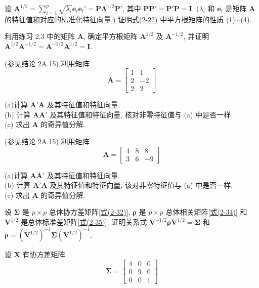 \medskip
{}\quad 设 $\mathbf{A}^{1/2}=\sum_{i=1}^{p}\sqrt{\lambda_{i}}\mathbf{e}_{i}\mathbf{e}_{i}'=\mathbf{P}\boldsymbol{\Lambda}^{1/2}\mathbf{P}'$, 其中 $\mathbf{P}\mathbf{P}'=\mathbf{P}'\mathbf{P}=\mathbf{I}$. ($\lambda_{i}$ 和 $\mathbf{e}_{i}$ 是矩阵 $\mathbf{A}$ 的特征值和对应的标准化特征向量.) 证明\hyperref[eq:2-22]{式(2-22)} 中平方根矩阵的性质 (1)$\sim$(4).

\medskip
{}\quad 利用练习 2.3 中的矩阵 $\mathbf{A}$, 确定平方根矩阵 $\mathbf{A}^{1/2}$ 及 $\mathbf{A}^{-1/2}$, 并证明 $\mathbf{A}^{1/2}\mathbf{A}^{-1/2}=\mathbf{A}^{-1/2}\mathbf{A}^{1/2}=\mathbf{I}$.

\medskip
{}\quad (参见结论 2A.15) 利用矩阵
\[
\mathbf{A}=\begin{bmatrix}1&1\\2&-2\\2&2\end{bmatrix}
\]
\begin{tabbing}
\hspace*{2em}\=(a)\quad \= 计算 $\mathbf{A}'\mathbf{A}$ 及其特征值和特征向量.\\[2pt]
\>(b)\> 计算 $\mathbf{A}\mathbf{A}'$ 及其特征值和特征向量, 核对非零特征值与 (a) 中是否一样.\\[2pt]
\>(c)\> 求出 $\mathbf{A}$ 的奇异值分解.
\end{tabbing}

\medskip
{}\quad (参见结论 2A.15) 利用矩阵
\[
\mathbf{A}=\begin{bmatrix}4&8&8\\3&6&-9\end{bmatrix}
\]
\begin{tabbing}
\hspace*{2em}\=(a)\quad \= 计算 $\mathbf{A}\mathbf{A}'$ 及其特征值和特征向量.\\[2pt]
\>(b)\> 计算 $\mathbf{A}'\mathbf{A}$ 及其特征值和特征向量, 该对非零特征值与 (a) 中是否一样.\\[2pt]
\>(c)\> 求出 $\mathbf{A}$ 的奇异值分解.
\end{tabbing}

\medskip
{}\quad 设 $\boldsymbol{\Sigma}$ 是 $p\times p$ 总体协方差矩阵[\hyperref[eq:2-32]{式(2-32)}], $\boldsymbol{\rho}$ 是 $p\times p$ 总体相关矩阵[\hyperref[eq:2-34]{式(2-34)}] 和 $\mathbf{V}^{1/2}$ 是总体标准差矩阵[\hyperref[eq:2-35]{式(2-35)}]. 证明关系式 $\mathbf{V}^{-1/2}\boldsymbol{\rho}\mathbf{V}^{1/2}=\boldsymbol{\Sigma}$ 和 $\boldsymbol{\rho}=(\mathbf{V}^{1/2})^{-1}\boldsymbol{\Sigma}(\mathbf{V}^{1/2})^{-1}$.

\medskip
{}\quad 设 $\mathbf{X}$ 有协方差矩阵
\[
\boldsymbol{\Sigma}=\begin{bmatrix}4&0&0\\0&9&0\\0&0&1\end{bmatrix}
\]
